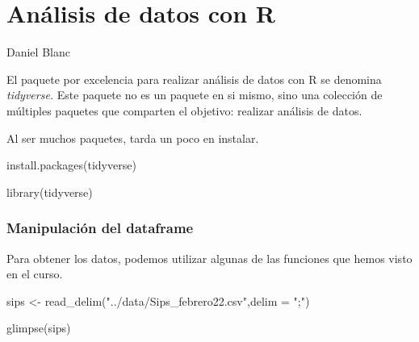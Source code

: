 \documentclass[
  letterpaper,
  DIV=11,
  numbers=noendperiod]{scrreprt}
\newenvironment{Shaded}{\begin{snugshade}}{\end{snugshade}}
\newcommand{\AttributeTok}[1]{\textcolor[rgb]{0.40,0.45,0.13}{#1}}
\newcommand{\FunctionTok}[1]{\textcolor[rgb]{0.28,0.35,0.67}{#1}}
\newcommand{\NormalTok}[1]{\textcolor[rgb]{0.00,0.23,0.31}{#1}}
\newcommand{\OtherTok}[1]{\textcolor[rgb]{0.00,0.23,0.31}{#1}}
\newcommand{\StringTok}[1]{\textcolor[rgb]{0.13,0.47,0.30}{#1}}
\begin{document}
\hypertarget{anuxe1lisis-de-datos-con-r}{%
\chapter{Análisis de datos con R}\label{anuxe1lisis-de-datos-con-r}}

Daniel Blanc

\hfill\break

El paquete por excelencia para realizar análisis de datos con R se
denomina \emph{tidyverse.} Este paquete no es un paquete en si mismo,
sino una colección de múltiples paquetes que comparten el objetivo:
realizar análisis de datos.

Al ser muchos paquetes, tarda un poco en instalar.

\begin{Shaded}
\begin{Highlighting}[]
\FunctionTok{install.packages}\NormalTok{(}\StringTok{\textquotesingle{}tidyverse\textquotesingle{}}\NormalTok{)}
\end{Highlighting}
\end{Shaded}

\begin{Shaded}
\begin{Highlighting}[]
\FunctionTok{library}\NormalTok{(tidyverse)}
\end{Highlighting}
\end{Shaded}

\hypertarget{manipulaciuxf3n-del-dataframe}{%
\subsection{Manipulación del
dataframe}\label{manipulaciuxf3n-del-dataframe}}

Para obtener los datos, podemos utilizar algunas de las funciones que
hemos visto en el curso.

\begin{Shaded}
\begin{Highlighting}[]
\NormalTok{sips }\OtherTok{\textless{}{-}} \FunctionTok{read\_delim}\NormalTok{(}\StringTok{"../data/Sips\_febrero22.csv"}\NormalTok{,}\AttributeTok{delim =} \StringTok{";"}\NormalTok{)}
\end{Highlighting}
\end{Shaded}

\begin{Shaded}
\begin{Highlighting}[]
\FunctionTok{glimpse}\NormalTok{(sips)}
\end{Highlighting}
\end{Shaded}
\end{document}
